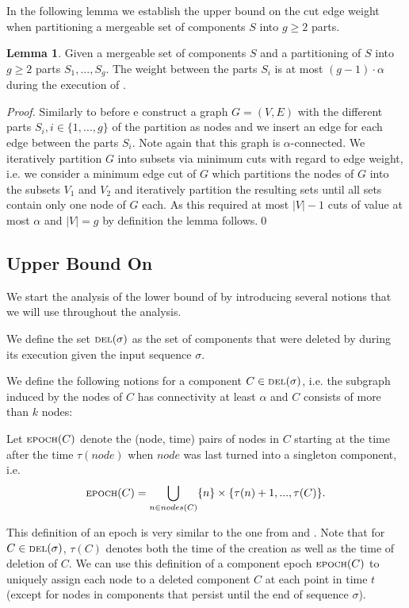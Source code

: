 \documentclass[a4paper,xcolor=dvipsnames, tikz, 12pt]{article}
\newcommand{\crep}{\text{C{\scriptsize REP}}}
\newcommand{\del}{\text{\scriptsize DEL}}
\newcommand{\epoch}{\text{\scriptsize EPOCH}}
\theoremstyle{definition}
\newtheorem{lemma}[defi]{Lemma}
\begin{document}
In the following lemma we establish the upper bound on the cut edge weight when partitioning a mergeable set of components $S$ into $g\geq2$ parts.

\begin{lemma}
	\label{cut_lemma_upper}
	Given a mergeable set of components $S$ and a partitioning of $S$ into $g\geq2$ parts $S_1,...,S_g$. The weight between the parts $S_i$ is at most $(g-1)\cdot\alpha$ during the execution of \crep{}.
\end{lemma}
\textit{Proof.} Similarly to before e construct a graph $G=(V,E)$ with the different parts $S_i, i\in\{1,...,g\}$ of the partition as nodes and we insert an edge for each edge between the parts $S_i$. Note again that this graph is $\alpha$-connected. We iteratively partition $G$ into subsets via minimum cuts with regard to edge weight, i.e. we consider a minimum edge cut of $G$ which partitions the nodes of $G$ into the subsets $V_1$ and $V_2$ and iteratively partition the resulting sets until all sets contain only one node of $G$ each. As this required at most $|V|-1$ cuts of value at most $\alpha$ and $|V|=g$ by definition the lemma follows.\qed


\subsection{Upper Bound On \crep{}}

We start the analysis of the lower bound of \crep{} by introducing several notions that we will use throughout the analysis.

We define the set $\del(\sigma)$ as the set of components that were deleted by \crep{} during its execution given the input sequence $\sigma$.

We define the following notions for a component $C\in\del{}(\sigma)$, i.e. the subgraph induced by the nodes of $C$ has connectivity at least $\alpha$ and $C$ consists of more than $k$ nodes:

Let $\epoch{}(C)$ denote the (node, time) pairs of nodes in $C$ starting at the time after the time $\tau(node)$ when $node$ was last turned into a singleton component, i.e. 
\begin{align*}
	\epoch{}(C)=\bigcup_{n\in nodes(C)}\{n\}\times\{\tau(n)+1,...,\tau(C)\}.
\end{align*}

This definition of an epoch is very similar to the one from \cite{Avin2016} and \cite{Avin2015}.
Note that for $C\in\del(\sigma)$, $\tau(C)$ denotes both the time of the creation as well as the time of deletion of $C$. We can use this definition of a component epoch $\epoch(C)$ to uniquely assign each node to a deleted component $C$ at each point in time $t$ (except for nodes in components that persist until the end of sequence $\sigma$).
\end{document}
